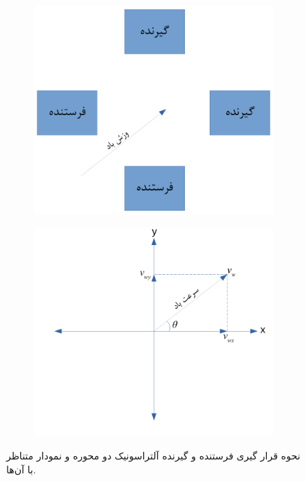 \begin{figure}[!h]
	\begin{subfigure}[b]{0.5\textwidth}
		\includegraphics[width=\linewidth]{Assets/ultrasonic 2d.pdf}
		\caption{}
		\label{fig:2dUltrasonic}
	\end{subfigure}
	\begin{subfigure}[b]{0.5\textwidth}
		\includegraphics[width=\linewidth]{Assets/ultrasonic 2d axis.pdf}
		\caption{}
		\label{fig:2dUltrasonicAxis}
	\end{subfigure}
	\caption{نحوه قرار گیری فرستنده و گیرنده آلتراسونیک دو محوره و نمودار متناظر با آن‌ها.}
\end{figure}

